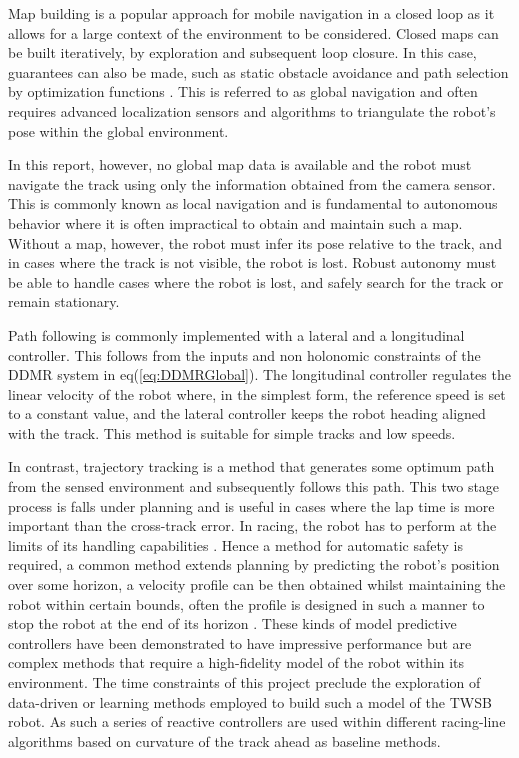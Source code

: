         Map building is a popular approach for mobile navigation in a closed loop as it allows for a large 
        context of the environment to be considered. Closed maps can be built iteratively, by exploration 
        and subsequent loop closure. In this case, guarantees can also be made, 
        such as static obstacle avoidance and path selection by optimization functions \cite{Macenski_2020}. 
        This is referred to as global navigation and often requires advanced localization sensors 
        and algorithms to triangulate the robot's pose within the global environment.
               
        In this report, however, no global map data is available and the robot must navigate 
        the track using only the information obtained from the camera sensor. This is commonly known as local navigation
        and is fundamental to autonomous behavior where it is often impractical to obtain and maintain such a map. Without a map, 
        however, the robot must infer its pose relative to the track, and in cases where the track is not visible, the robot is lost. 
        Robust autonomy must be able to handle cases where the robot is lost, and safely search for the track or remain stationary. 
       
        Path following is commonly implemented with a lateral and a longitudinal controller. This follows from the 
        inputs and non holonomic constraints of the DDMR system in eq(\ref{eq:DDMRGlobal}).
        The longitudinal controller regulates the linear velocity of the robot where, in the simplest form, the reference speed 
        is set to a constant value, and the lateral controller keeps the robot heading aligned with the track. 
        This method is suitable for simple tracks and low speeds.
               
        In contrast, trajectory tracking is a method that generates some optimum path from the sensed environment and subsequently follows this path.
        This two stage process is falls under planning and is useful in cases where the lap time is more important than the cross-track error.
        In racing, the robot has to perform at the limits of its handling capabilities \cite{wischnewski2022indy}. Hence a method 
        for automatic safety is required, a common method extends planning by predicting the robot's position over some horizon,
        a velocity profile can be then obtained whilst maintaining the robot within certain bounds, often the profile is 
        designed in such a manner to stop the robot at the end of its horizon \cite{williams2016aggressive}. These kinds of model predictive controllers 
        have been demonstrated to have impressive performance but are complex methods that require a high-fidelity model of the robot within its environment. 
        The time constraints of this project preclude the exploration of data-driven 
        or learning methods employed to build such a model of the TWSB robot. As such a series of reactive controllers are used within different 
        racing-line algorithms based on curvature of the track ahead as baseline methods.
                   

